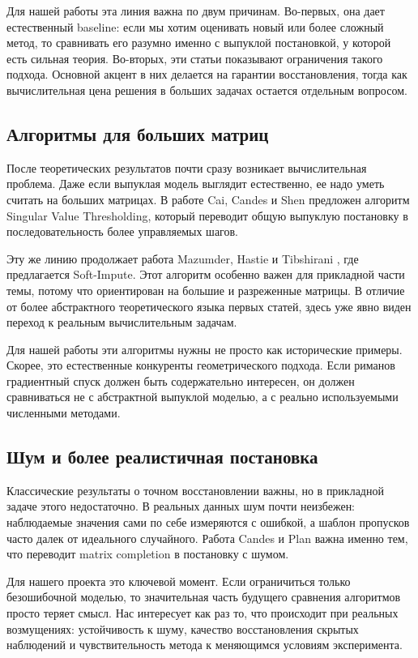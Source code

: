 \documentclass[a4paper,12pt]{article}
\begin{document}
Для нашей работы эта линия важна по двум причинам. Во-первых, она дает естественный baseline: если мы хотим оценивать новый или более сложный метод, то сравнивать его разумно именно с выпуклой постановкой, у которой есть сильная теория. Во-вторых, эти статьи показывают ограничения такого подхода. Основной акцент в них делается на гарантии восстановления, тогда как вычислительная цена решения в больших задачах остается отдельным вопросом.

\subsection{Алгоритмы для больших матриц}

После теоретических результатов почти сразу возникает вычислительная проблема. Даже если выпуклая модель выглядит естественно, ее надо уметь считать на больших матрицах. В работе Cai, Candes и Shen \cite{cai-svt} предложен алгоритм Singular Value Thresholding, который переводит общую выпуклую постановку в последовательность более управляемых шагов.

Эту же линию продолжает работа Mazumder, Hastie и Tibshirani \cite{mazumder}, где предлагается Soft-Impute. Этот алгоритм особенно важен для прикладной части темы, потому что ориентирован на большие и разреженные матрицы. В отличие от более абстрактного теоретического языка первых статей, здесь уже явно виден переход к реальным вычислительным задачам.

Для нашей работы эти алгоритмы нужны не просто как исторические примеры. Скорее, это естественные конкуренты геометрического подхода. Если риманов градиентный спуск должен быть содержательно интересен, он должен сравниваться не с абстрактной выпуклой моделью, а с реально используемыми численными методами.

\subsection{Шум и более реалистичная постановка}

Классические результаты о точном восстановлении важны, но в прикладной задаче этого недостаточно. В реальных данных шум почти неизбежен: наблюдаемые значения сами по себе измеряются с ошибкой, а шаблон пропусков часто далек от идеального случайного. Работа Candes и Plan \cite{candes-plan} важна именно тем, что переводит matrix completion в постановку с шумом.

Для нашего проекта это ключевой момент. Если ограничиться только безошибочной моделью, то значительная часть будущего сравнения алгоритмов просто теряет смысл. Нас интересует как раз то, что происходит при реальных возмущениях: устойчивость к шуму, качество восстановления скрытых наблюдений и чувствительность метода к меняющимся условиям эксперимента.
\end{document}
